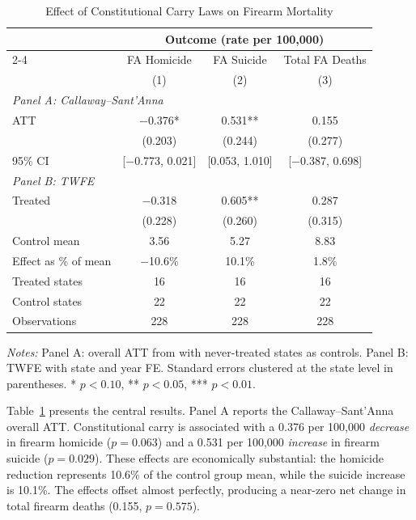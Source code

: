 \documentclass[12pt]{article}
\begin{document}
\begin{table}[H]
\centering
\caption{Effect of Constitutional Carry Laws on Firearm Mortality}
\begin{threeparttable}
\begin{tabular}{lccc}
\toprule
& \multicolumn{3}{c}{Outcome (rate per 100,000)} \\
\cmidrule(lr){2-4}
& FA Homicide & FA Suicide & Total FA Deaths \\
& (1) & (2) & (3) \\
\midrule
\multicolumn{4}{l}{\textit{Panel A: Callaway--Sant'Anna}} \\[3pt]
ATT & $-$0.376* & 0.531** & 0.155 \\
& (0.203) & (0.244) & (0.277) \\
95\% CI & [$-$0.773, 0.021] & [0.053, 1.010] & [$-$0.387, 0.698] \\[6pt]
\multicolumn{4}{l}{\textit{Panel B: TWFE}} \\[3pt]
Treated & $-$0.318 & 0.605** & 0.287 \\
& (0.228) & (0.260) & (0.315) \\
\midrule
Control mean & 3.56 & 5.27 & 8.83 \\
Effect as \% of mean & $-$10.6\% & 10.1\% & 1.8\% \\
Treated states & 16 & 16 & 16 \\
Control states & 22 & 22 & 22 \\
Observations & 228 & 228 & 228 \\
\bottomrule
\end{tabular}
\begin{tablenotes}[flushleft]
\small
\item \textit{Notes:} Panel A: overall ATT from \citet{callaway2021} with never-treated states as controls. Panel B: TWFE with state and year FE. Standard errors clustered at the state level in parentheses. * $p<0.10$, ** $p<0.05$, *** $p<0.01$.
\end{tablenotes}
\end{threeparttable}
\label{tab:main}
\end{table}

Table~\ref{tab:main} presents the central results. Panel A reports the Callaway--Sant'Anna overall ATT. Constitutional carry is associated with a 0.376 per 100,000 \textit{decrease} in firearm homicide ($p = 0.063$) and a 0.531 per 100,000 \textit{increase} in firearm suicide ($p = 0.029$). These effects are economically substantial: the homicide reduction represents 10.6\% of the control group mean, while the suicide increase is 10.1\%. The effects offset almost perfectly, producing a near-zero net change in total firearm deaths (0.155, $p = 0.575$).
\end{document}
